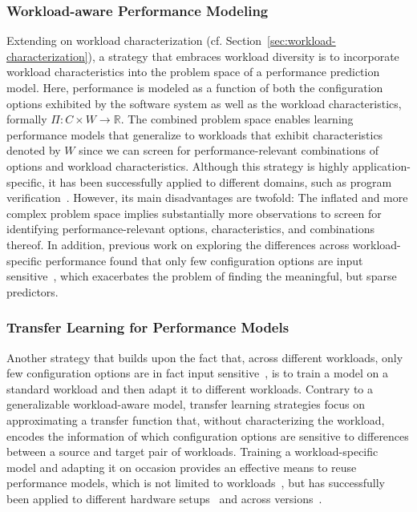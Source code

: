 \subsubsection{Workload-aware Performance Modeling}\label{sec:workload-aware}
Extending on workload characterization (cf. Section~\ref{sec:workload-characterization}), a strategy that embraces workload diversity is to incorporate workload characteristics into the problem space of a performance prediction model. Here, performance is modeled as a function of both the configuration options exhibited by the software system as well as the workload characteristics, formally $\Pi: C \times W \rightarrow \mathbb{R}$.
The combined problem space enables learning performance models that generalize to workloads that exhibit characteristics denoted by $W$ since we can screen for performance-relevant combinations of options and workload characteristics. Although this strategy is highly application-specific, it has been successfully applied to different domains, such as program verification~\cite{koc_satune_2021}. However, its main disadvantages are twofold: The inflated and more complex problem space implies substantially more observations to screen for identifying performance-relevant options, characteristics, and combinations thereof. In addition, previous work on exploring the differences across workload-specific performance found that only few configuration options are input sensitive~\cite{jamishidi_transfer_2017}, which exacerbates the problem of finding the meaningful, but sparse predictors.

\subsubsection{Transfer Learning for Performance Models}\label{sec:transfer}
Another strategy that builds upon the fact that, across different workloads, only few configuration options are in fact input sensitive~\cite{jamishidi_transfer_2017}, is to train a model on a standard workload and then adapt it to different workloads. Contrary to a generalizable workload-aware model, transfer learning strategies focus on approximating a transfer function that, without characterizing the workload, encodes the information of which configuration options are sensitive to differences between a source and target pair of workloads. Training a workload-specific model and adapting it on occasion provides an effective means to reuse performance models, which is not limited to workloads~\cite{jamshidi_learning_2018}, but has successfully been applied to different hardware setups~\cite{ding_bayesian_2020,valov_transferring_performance_2017} and across versions~\cite{martin_transfer_2021}. \\


